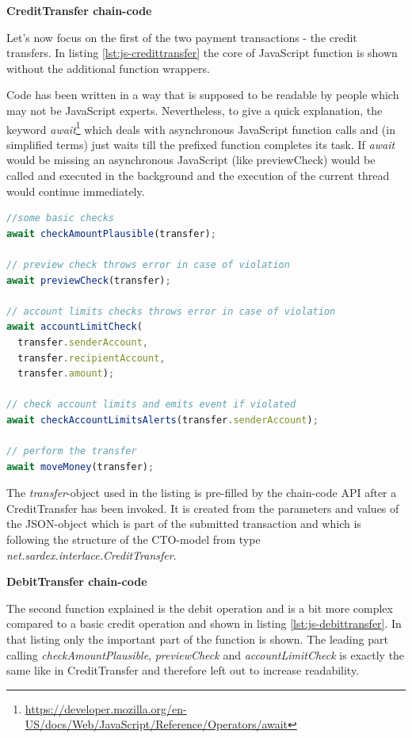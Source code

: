 \textbf{CreditTransfer chain-code}

Let's now focus on the first of the two payment transactions - the credit transfers. In listing \ref{lst:js-credittransfer} the core of JavaScript function is shown without the additional function wrappers.

Code has been written in a way that is supposed to be readable by people which may not be JavaScript experts. Nevertheless, to give a quick explanation, the keyword \textit{await}\footnote{\url{https://developer.mozilla.org/en-US/docs/Web/JavaScript/Reference/Operators/await}} which deals with asynchronous JavaScript function calls and (in simplified terms) just waits till the prefixed function completes its task. If \textit{await} would be missing an asynchronous JavaScript (like previewCheck) would be called and executed in the background and the execution of the current thread would continue immediately.

\begin{center}
\begin{minipage}{0.8\textwidth}
\small
\begin{lstlisting}[language=javascript,firstnumber=1,caption={\bf\small CreditTransfer JavaScript}, captionpos=b,label=lst:js-credittransfer]
//some basic checks
await checkAmountPlausible(transfer);

// preview check throws error in case of violation
await previewCheck(transfer);

// account limits checks throws error in case of violation
await accountLimitCheck(
  transfer.senderAccount,
  transfer.recipientAccount,
  transfer.amount);

// check account limits and emits event if violated
await checkAccountLimitsAlerts(transfer.senderAccount);

// perform the transfer
await moveMoney(transfer);
\end{lstlisting}
\end{minipage}
\end{center}

The \textit{transfer}-object used in the listing is pre-filled by the chain-code API after a CreditTransfer has been invoked. It is created from the parameters and values of the JSON-object which is part of the submitted transaction and which is following the structure of the CTO-model from type \textit{net.sardex.interlace.CreditTransfer}.

\textbf{DebitTransfer chain-code}

The second function explained is the debit operation and is a bit more complex compared to a basic credit operation and shown in listing \ref{lst:js-debittransfer}. In that listing only the important part of the function is shown. The leading part calling \textit{checkAmountPlausible}, \textit{previewCheck} and \textit{accountLimitCheck} is exactly the same like in CreditTransfer and therefore left out to increase readability.

